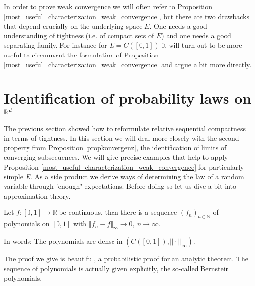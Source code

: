 In order to prove weak convergence we will often refer to Proposition \ref{most_useful_characterization_weak_convergence}, but there are two drawbacks that depend crucially on the underlying space $E$. One needs a good understanding of tightness (i.e. of compact sets of $E$) and one needs a good separating family. For instance for $E=C([0,1])$ it will turn out to be more useful to circumvent the formulation of Proposition \ref{most_useful_characterization_weak_convergence} and argue a bit more directly.

	\marginpar{\textcolor{red}{Lecture 14}}
\section[Identification of probability laws on $\R$]{Identification of probability laws on $\mathbb{R}^d$}\label{sec:unique}
The previous section showed how to reformulate relative sequential compactness in terms of tightness. In this section we will deal more closely with the second property from Proposition \ref{propkonvergenz}, the identification of limits of converging subsequences. We will give precise examples that help to apply Proposition \ref{most_useful_characterization_weak_convergence} for particularly simple $E$. As a side product we derive ways of determining the law of a random variable through "{}enough"{} expectations. Before doing so let us dive a bit into approximation theory.
\begin{lAussageWerkzeug}
\begin{theorem}\label{Weierstrass_approx}
	Let $f \colon [0,1] \to \mathbb{R}$ be continuous, then there is a sequence $(f_n)_{n\in\mathbb{N}}$ of polynomials on $[0,1]$ with $\left\Vert f_n - f \right\Vert_{\infty} \to 0, \: n \to \infty$.\smallskip
	
	In words: The polynomials are dense in $( C([0,1]),||\cdot||_\infty)$.
\end{theorem}
\end{lAussageWerkzeug}
The proof we give is beautiful, a probabilistic proof for an analytic theorem. The sequence of polynomials is actually given explicitly, the so-called Bernstein polynomials.
